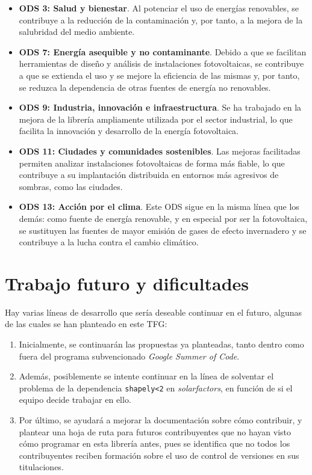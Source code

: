 \begin{itemize}
    \item \textbf{ODS 3: Salud y bienestar}. Al potenciar el uso de energías renovables, se contribuye a la reducción de la contaminación y, por tanto, a la mejora de la salubridad del medio ambiente.
    \item \textbf{ODS 7: Energía asequible y no contaminante}. Debido a que se facilitan herramientas de diseño y análisis de instalaciones fotovoltaicas, se contribuye a que se extienda el uso y se mejore la eficiencia de las mismas y, por tanto, se reduzca la dependencia de otras fuentes de energía no renovables.
    \item \textbf{ODS 9: Industria, innovación e infraestructura}. Se ha trabajado en la mejora de la librería \pvlibpy{} ampliamente utilizada por el sector industrial, lo que facilita la innovación y desarrollo de la energía fotovoltaica.
    \item \textbf{ODS 11: Ciudades y comunidades sostenibles}. Las mejoras facilitadas permiten analizar instalaciones fotovoltaicas de forma más fiable, lo que contribuye a su implantación distribuida en entornos más agresivos de sombras, como las ciudades.
    \item \textbf{ODS 13: Acción por el clima}. Este ODS sigue en la misma línea que los demás: como fuente de energía renovable, y en especial por ser la fotovoltaica, se sustituyen las fuentes de mayor emisión de gases de efecto invernadero y se contribuye a la lucha contra el cambio climático.
\end{itemize}


\section{Trabajo futuro y dificultades} \label{sct:resultados:trabajofuturo}

Hay varias líneas de desarrollo que sería deseable continuar en el futuro, algunas de las cuales se han planteado en este TFG:

\begin{enumerate}
    \item Inicialmente, se continuarán las propuestas ya planteadas, tanto dentro como fuera del programa subvencionado \textit{Google Summer of Code}.
    \item Además, posiblemente se intente continuar en la línea de solventar el problema de la dependencia \texttt{shapely<2} en \textit{solarfactors}, en función de si el equipo decide trabajar en ello.
    \item Por último, se ayudará a mejorar la documentación sobre cómo contribuir, y plantear una hoja de ruta para futuros contribuyentes que no hayan visto cómo programar en esta librería antes, pues se identifica que no todos los contribuyentes reciben formación sobre el uso de control de versiones en sus titulaciones.
\end{enumerate}

